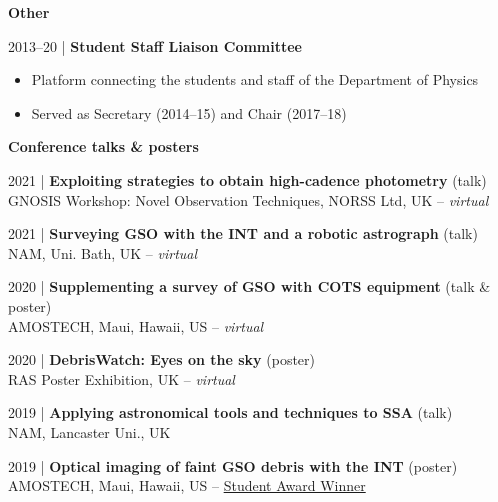 \documentclass[10pt,a4paper]{altacv}
\begin{document}
\divider

\normalsize \textbf{Other}

\medskip

\small 2013--20 | \textbf{Student Staff Liaison Committee} \\
\smallskip
\begin{itemize}
	\item Platform connecting the students and staff of the Department of Physics
	\item Served as Secretary (2014--15) and Chair (2017--18)
\end{itemize}

\medskip



\normalsize \textbf{Conference talks \& posters}

\medskip

\small 2021 | \textbf{Exploiting strategies to obtain high-cadence photometry} (talk) \\
GNOSIS Workshop: Novel Observation Techniques, NORSS Ltd, UK -- \textit{virtual}

\smallskip

\small 2021 | \textbf{Surveying GSO with the INT and a robotic astrograph} (talk) \\
NAM, Uni. Bath, UK -- \textit{virtual}

\smallskip

\small 2020 | \textbf{Supplementing a survey of GSO with COTS equipment} (talk \& poster) \\
AMOSTECH, Maui, Hawaii, US -- \textit{virtual}

\smallskip

\small 2020 | \textbf{DebrisWatch: Eyes on the sky} (poster) \\
RAS Poster Exhibition, UK -- \textit{virtual}

\smallskip

\small 2019 | \textbf{Applying astronomical tools and techniques to SSA} (talk) \\
NAM, Lancaster Uni., UK

\smallskip

\small 2019 | \textbf{Optical imaging of faint GSO debris with the INT} (poster) \\
AMOSTECH, Maui, Hawaii, US -- \href{https://amostech.com/2019-archive/}{Student Award Winner}

\smallskip
\end{document}
